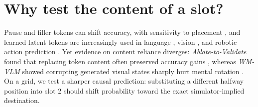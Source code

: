 \documentclass{article}
\begin{document}
\section{Why test the content of a slot?}
Pause and filler tokens can shift accuracy, with sensitivity to placement \citep{goyal2023,pfau2024,jang2025}, and learned latent tokens are increasingly used in language \citep{hao2024}, vision \citep{ray2025}, and robotic action prediction \citep{huang2026,bai2026}. Yet evidence on content reliance diverges: \emph{Ablate-to-Validate} found that replacing token content often preserved accuracy gains \citep{zhang2026}, whereas \emph{WM-VLM} showed corrupting generated visual states sharply hurt mental rotation \citep{zha2026}. On a grid, we test a sharper causal prediction: substituting a different halfway position into slot 2 should shift probability toward the exact simulator-implied destination.
\end{document}
